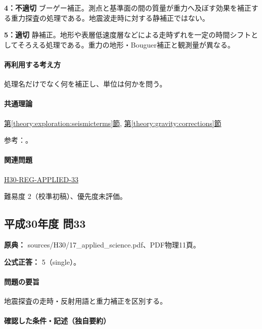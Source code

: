 \noindent\textbf{4：不適切} ブーゲー補正。測点と基準面の間の質量が重力へ及ぼす効果を補正する重力探査の処理である。地震波走時に対する静補正ではない。\par

\noindent\textbf{5：適切} 静補正。地形や表層低速度層などによる走時ずれを一定の時間シフトとしてそろえる処理である。重力の地形・Bouguer補正と観測量が異なる。\par

\paragraph{再利用する考え方} 処理名だけでなく何を補正し、単位は何かを問う。

\paragraph{共通理論} \hyperref[theory:exploration:seismicterms]{第\ref*{theory:exploration:seismicterms}節}, \hyperref[theory:gravity:corrections]{第\ref*{theory:gravity:corrections}節}

\par 参考：\cite{usgs_refraction2013,epa_seismic_reflection,usgs_static2004,usgs_processing2000}。

\paragraph{関連問題} \hyperref[q:h30-reg-applied-33]{H30-REG-APPLIED-33}

\par 難易度 2（校準初稿）、優先度未評価。

\subsection{平成30年度 問33}
\label{q:h30-reg-applied-33}

\noindent\textbf{原典：} sources/H30/17\_applied\_science.pdf、PDF物理11頁。

\textbf{公式正答：} 5（single）。

\paragraph{問題の要旨} 地震探査の走時・反射用語と重力補正を区別する。

\paragraph{確認した条件・記述（独自要約）}\mbox{}\par

